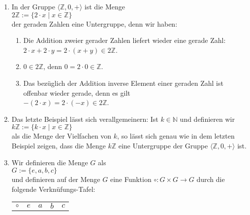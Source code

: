 \examples
\begin{enumerate}
\item In der Gruppe $\langle \mathbb{Z}, 0, + \rangle$ ist die Menge
      \\[0.2cm]
      \hspace*{1.3cm}
      $2 \mathbb{Z} := \{ 2 \cdot x \mid x \in \mathbb{Z} \}$
      \\[0.2cm]
      der geraden Zahlen eine Untergruppe, denn wir haben:
      \begin{enumerate}
      \item Die Addition zweier gerader Zahlen liefert wieder eine gerade Zahl:
            \\[0.2cm]
            \hspace*{1.3cm}
            $2 \cdot x + 2 \cdot y = 2 \cdot (x + y) \in 2 \mathbb{Z}$.
      \item $0 \in 2 \mathbb{Z}$, denn $0 = 2 \cdot 0 \in \mathbb{Z}$.
      \item Das bezüglich der Addition inverse Element einer geraden Zahl ist offenbar wieder gerade,
            denn es gilt
            \\[0.2cm]
            \hspace*{1.3cm}
            $- (2 \cdot x) = 2 \cdot (-x) \in 2 \mathbb{Z}$.
      \end{enumerate}
\item Das letzte Beispiel lässt sich verallgemeinern: Ist $k \in \mathbb{N}$ und definieren wir
      \\[0.2cm]
      \hspace*{1.3cm}
      $k \mathbb{Z} := \{ k \cdot x \mid x \in \mathbb{Z} \}$
      \\[0.2cm]
      als die Menge der Vielfachen von $k$, so lässt sich genau wie in dem letzten Beispiel zeigen, dass
      die Menge $k\mathbb{Z}$ eine Untergruppe der Gruppe $\langle \mathbb{Z}, 0, + \rangle$ ist.
\item Wir definieren die Menge $G$ als
      \\[0.2cm]
      \hspace*{1.3cm}
      $G := \{ e, a, b, c \}$
      \\[0.2cm]
      und definieren auf der Menge $G$ eine Funktion $\circ: G \times G \rightarrow G$ durch
      die folgende Verknüfungs-Tafel:
      \\[0.2cm]
      \hspace*{1.3cm}
      \begin{tabular}[t]{l|llll}
      $\circ$ & $e$ & $a$ & $b$ & $c$ \\

\end{tabular}
\end{enumerate}
